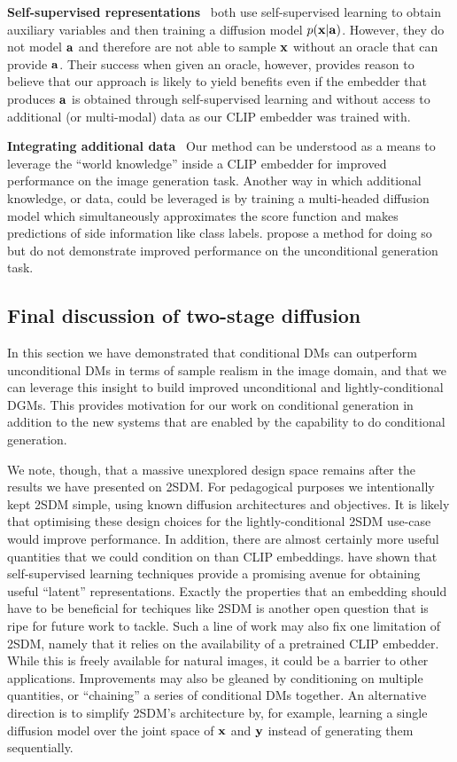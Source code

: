 \textbf{Self-supervised representations}~
\citet{bao2022conditional,hu2022self} both use self-supervised learning to obtain auxiliary variables and then training a diffusion model $p({\mathbf{x}}|{\mathbf{a}})$. However, they do not model ${\mathbf{a}}$ and therefore are not able to sample ${\mathbf{x}}$ without an oracle that can provide ${\mathbf{a}}$. Their success when given an oracle, however, provides reason to believe that our approach is likely to yield benefits even if the embedder that produces ${\mathbf{a}}$ is obtained through self-supervised learning and without access to additional (or multi-modal) data as our CLIP embedder was trained with.

\textbf{Integrating additional data}~
Our method can be understood as a means to leverage the ``world knowledge'' inside a CLIP embedder for improved performance on the image generation task. Another way in which additional knowledge, or data, could be leveraged is by training a multi-headed diffusion model which simultaneously approximates the score function and makes predictions of side information like class labels. \citet{deja2023learning} propose a method for doing so but do not demonstrate improved performance on the unconditional generation task.

\subsection{Final discussion of two-stage diffusion}
In this section we have demonstrated that conditional DMs can outperform unconditional DMs in terms of sample realism in the image domain, and that we can leverage this insight to build improved unconditional and lightly-conditional DGMs. This provides motivation for our work on conditional generation in addition to the new systems that are enabled by the capability to do conditional generation. 

We note, though, that a massive unexplored design space remains after the results we have presented on 2SDM. For pedagogical purposes we intentionally kept 2SDM simple, using known diffusion architectures and objectives. It is likely that optimising these design choices for the lightly-conditional 2SDM use-case would improve performance. In addition, there are almost certainly more useful quantities that we could condition on than CLIP embeddings. 
\citet{bao2022conditional,hu2022self} have shown that self-supervised learning techniques provide a promising avenue for obtaining useful ``latent'' representations. Exactly the properties that an embedding should have to be beneficial for techiques like 2SDM is another open question that is ripe for future work to tackle. Such a line of work may also fix one limitation of 2SDM, namely that it relies on the availability of a pretrained CLIP embedder. While this is freely available for natural images, it could be a barrier to other applications. Improvements may also be gleaned by conditioning on multiple quantities, or ``chaining'' a series of conditional DMs together. An alternative direction is to simplify 2SDM's architecture by, for example, learning a single diffusion model over the joint space of ${\mathbf{x}}$ and ${\mathbf{y}}$ instead of generating them sequentially.

